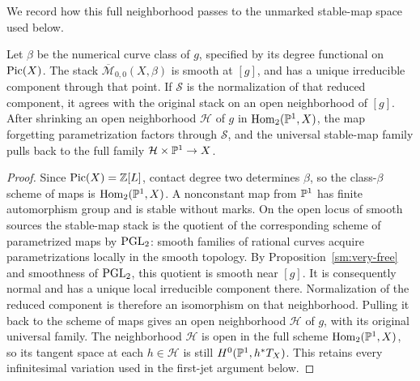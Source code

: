 We record how this full neighborhood passes to the unmarked
stable-map space used below.

\begin{lemma}\label{sm:full-germ}
Let $\beta$ be the numerical curve class of $g$, specified by
its degree functional on $\operatorname{Pic}(X)$. The stack
$\overline{\mathcal M}_{0,0}(X,\beta)$ is smooth at $[g]$,
and has a unique irreducible component through that point.
If $\mathcal S$ is the normalization of that reduced
component, it agrees with the original stack on an open
neighborhood of $[g]$. After shrinking an open neighborhood
$\mathcal H$ of $g$ in $\operatorname{Hom}_2(\mathbb P^1,X)$, the map forgetting
parametrization factors through $\mathcal S$, and the
universal stable-map family pulls back to the full family
$\mathcal H\times\mathbb P^1\to X$.
\end{lemma}

\begin{proof}
Since $\operatorname{Pic}(X)=\mathbb Z[L]$, contact degree two determines $\beta$,
so the class-$\beta$ scheme of maps is $\operatorname{Hom}_2(\mathbb P^1,X)$.
A nonconstant map from $\mathbb P^1$ has finite
automorphism group and is stable without marks.
On the open locus of smooth sources the stable-map stack is
the quotient of the corresponding scheme of parametrized
maps by $\operatorname{PGL}_2$: smooth families of rational curves acquire
parametrizations locally in the smooth topology.
By Proposition~\ref{sm:very-free} and smoothness of $\operatorname{PGL}_2$,
this quotient is smooth near $[g]$. It is consequently normal
and has a unique local irreducible component there.
Normalization of the reduced component is therefore an
isomorphism on that neighborhood. Pulling it back to the
scheme of maps gives an open neighborhood $\mathcal H$ of
$g$, with its original universal family. The neighborhood
$\mathcal H$ is open in the full scheme $\operatorname{Hom}_2(\mathbb P^1,X)$, so
its tangent space at each $h\in\mathcal H$ is still
$H^0(\mathbb P^1,h^*T_X)$. This retains every infinitesimal variation
used in the first-jet argument below.
\end{proof}
